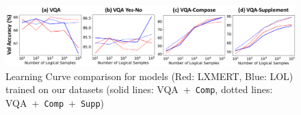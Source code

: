 \begin{figure}[t]
    \centering
    \includegraphics[width=\linewidth]{vqalol/images/fig_exp3_new.png}
    \caption{
    Learning Curve comparison for models (Red: LXMERT, Blue: LOL) trained on our datasets (solid lines: VQA~+~\texttt{Comp}, dotted lines: VQA~+~\texttt{Comp}~+~\texttt{Supp})
    }
    \label{fig:exp3}
\end{figure}
